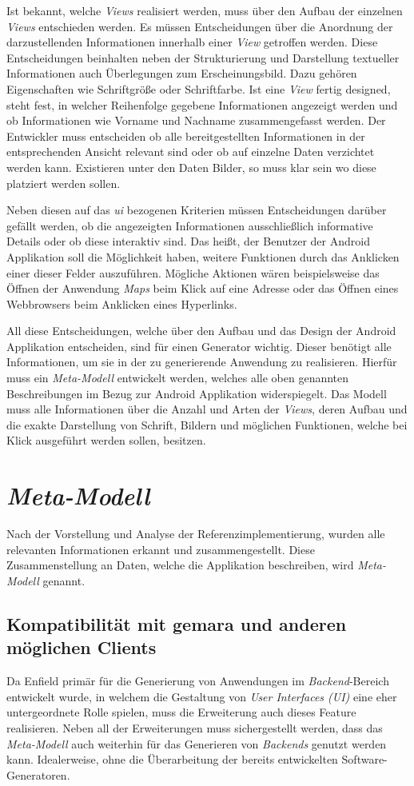 Ist bekannt, welche \textit{Views} realisiert werden, muss über den Aufbau der einzelnen \textit{Views} entschieden werden. Es müssen Entscheidungen über die Anordnung der darzustellenden Informationen innerhalb einer \textit{View} getroffen werden. Diese Entscheidungen beinhalten neben der Strukturierung und Darstellung textueller Informationen auch Überlegungen zum Erscheinungsbild. Dazu gehören Eigenschaften wie Schriftgröße oder Schriftfarbe. Ist eine \textit{View} fertig designed, steht fest, in welcher Reihenfolge gegebene Informationen angezeigt werden und ob Informationen wie Vorname und Nachname zusammengefasst werden.
Der Entwickler muss entscheiden ob alle bereitgestellten Informationen in der entsprechenden Ansicht relevant sind oder ob auf einzelne Daten verzichtet werden kann. Existieren unter den Daten Bilder, so muss klar sein wo diese platziert werden sollen.

Neben diesen auf das \textit{\acf{ui}} bezogenen Kriterien müssen Entscheidungen darüber gefällt werden, ob die angezeigten Informationen ausschließlich informative Details oder ob diese interaktiv sind. Das heißt, der Benutzer der Android Applikation soll die Möglichkeit haben, weitere Funktionen durch das Anklicken einer dieser Felder auszuführen. Mögliche Aktionen wären beispielsweise das Öffnen der Anwendung \textit{Maps} beim Klick auf eine Adresse oder das Öffnen eines Webbrowsers beim Anklicken eines Hyperlinks. 

All diese Entscheidungen, welche über den Aufbau und das Design der Android Applikation entscheiden, sind für einen Generator wichtig. Dieser benötigt alle Informationen, um sie in der zu generierende Anwendung zu realisieren. Hierfür muss ein \textit{Meta-Modell} entwickelt werden, welches alle oben genannten Beschreibungen im Bezug zur Android Applikation widerspiegelt. Das Modell muss alle Informationen über die Anzahl und Arten der \textit{Views}, deren Aufbau und die exakte Darstellung von Schrift, Bildern und möglichen Funktionen, welche bei Klick ausgeführt werden sollen, besitzen.

\section{\textit{Meta-Modell}}
Nach der Vorstellung und Analyse der Referenzimplementierung, wurden alle relevanten Informationen erkannt und zusammengestellt. Diese Zusammenstellung an Daten, welche die Applikation beschreiben, wird \textit{Meta-Modell} genannt.

\subsection{Kompatibilität mit \acs{gemara} und anderen möglichen Clients}
Da Enfield primär für die Generierung von Anwendungen im \textit{Backend}-Bereich entwickelt wurde, in welchem die Gestaltung von \textit{User Interfaces (UI)} eine eher untergeordnete Rolle spielen, muss die Erweiterung auch dieses Feature realisieren. Neben all der Erweiterungen muss sichergestellt werden, dass das \textit{Meta-Modell} auch weiterhin für das Generieren von \textit{Backends} genutzt werden kann. Idealerweise, ohne die Überarbeitung der bereits entwickelten Software-Generatoren. 

